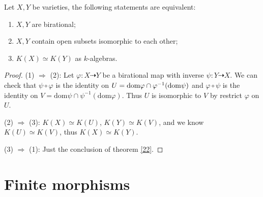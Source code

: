 \begin{corollary}
	Let $ X,Y $ be varieties, the following statements are equivalent:
	\begin{enumerate}
		\item $ X,Y $ are birational;
		\item $ X,Y $ contain open subsets isomorphic to each other;
		\item $ K(X)\simeq K(Y) $ as $ k $-algebras.
	\end{enumerate}
\end{corollary}
\begin{proof}
	(1) $ \Rightarrow $ (2): Let $ \varphi:X\dashrightarrow Y  $ be a birational map with inverse $ \psi :Y\dashrightarrow X $. We can check that $ \psi\circ\varphi $ is the identity on $ U= \mathrm{dom}\varphi\cap \varphi^{-1}(\rm{dom}\psi) $ and $ \varphi\circ\psi $ is the identity on $ V= \mathrm{dom}\psi\cap\psi^{-1}(\mathrm{dom}\varphi) $. Thus $ U $ is isomorphic to  $ V $ by restrict $ \varphi $ on $ U $.

	(2) $ \Rightarrow $ (3): $ K(X)\simeq K(U) $, $ K(Y)\simeq K(V) $, and we know $ K(U)\simeq K(V) $, thus $ K(X)\simeq K(Y) $.

	(3) $ \Rightarrow $ (1): Just the conclusion of theorem \ref{22}.
\end{proof}

\section{Finite morphisms}


